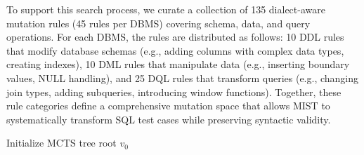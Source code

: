 
To support this search process, we curate a collection of 135 dialect-aware mutation rules (45 rules per DBMS) covering schema, data, and query operations. For each DBMS, the rules are distributed as follows: 10 DDL rules that modify database schemas (e.g., adding columns with complex data types, creating indexes), 10 DML rules that manipulate data (e.g., inserting boundary values, NULL handling), and 25 DQL rules that transform queries (e.g., changing join types, adding subqueries, introducing window functions). Together, these rule categories define a comprehensive mutation space that allows MIST to systematically transform SQL test cases while preserving syntactic validity.



\begin{algorithm}[t]
\caption{{\tt MCTS for test case mutation}}
\label{alg:traditional-mcts}
Initialize MCTS tree root $v_0$\;
\end{algorithm}


